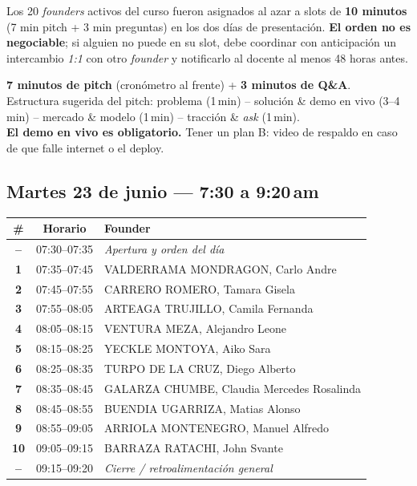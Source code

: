 \documentclass[11pt,a4paper]{article}
\begin{document}
Los 20 \emph{founders} activos del curso fueron asignados al azar a slots de
\textbf{10 minutos} (7 min pitch + 3 min preguntas) en los dos d\'ias de
presentaci\'on. \textbf{El orden no es negociable}; si alguien no puede en su
slot, debe coordinar con anticipaci\'on un intercambio \emph{1:1} con otro
\emph{founder} y notificarlo al docente al menos 48 horas antes.

\begin{tcolorbox}[tipbox={Formato del pitch (estricto)}]
\textbf{7 minutos de pitch} (cron\'ometro al frente) + \textbf{3 minutos de Q\&A}.\\[2pt]
Estructura sugerida del pitch: problema (1\,min) -- soluci\'on \& demo en vivo
(3--4\,min) -- mercado \& modelo (1\,min) -- tracci\'on \& \emph{ask} (1\,min).\\[2pt]
\textbf{El demo en vivo es obligatorio.} Tener un plan B: video de respaldo
en caso de que falle internet o el deploy.
\end{tcolorbox}

\subsection*{Martes 23 de junio --- 7:30 a 9:20\,am}

\renewcommand{\arraystretch}{1.18}
\begin{tabularx}{\linewidth}{@{}>{\bfseries\color{clawOrange}}c >{\ttfamily\small}c X@{}}
\toprule
\textcolor{clawDark}{\#} & \textcolor{clawDark}{\bfseries\rmfamily Horario} & \textcolor{clawDark}{\bfseries Founder} \\
\midrule
--  & 07:30--07:35 & \emph{Apertura y orden del d\'ia} \\
1   & 07:35--07:45 & VALDERRAMA MONDRAGON, Carlo Andre \\
2   & 07:45--07:55 & CARRERO ROMERO, Tamara Gisela \\
3   & 07:55--08:05 & ARTEAGA TRUJILLO, Camila Fernanda \\
4   & 08:05--08:15 & VENTURA MEZA, Alejandro Leone \\
5   & 08:15--08:25 & YECKLE MONTOYA, Aiko Sara \\
6   & 08:25--08:35 & TURPO DE LA CRUZ, Diego Alberto \\
7   & 08:35--08:45 & GALARZA CHUMBE, Claudia Mercedes Rosalinda \\
8   & 08:45--08:55 & BUENDIA UGARRIZA, Matias Alonso \\
9   & 08:55--09:05 & ARRIOLA MONTENEGRO, Manuel Alfredo \\
10  & 09:05--09:15 & BARRAZA RATACHI, John Svante \\
--  & 09:15--09:20 & \emph{Cierre / retroalimentaci\'on general} \\
\bottomrule
\end{tabularx}
\end{document}
